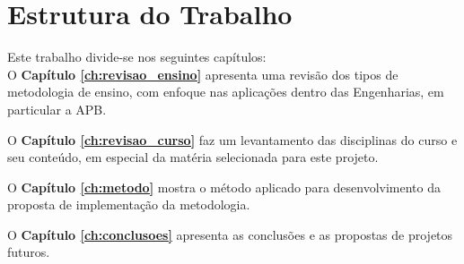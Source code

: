 	\section{Estrutura do Trabalho}
	
		Este trabalho divide-se nos seguintes capítulos:\\
		
		O \textbf{Capítulo \ref{ch:revisao_ensino}} apresenta uma revisão dos tipos de metodologia de ensino, com enfoque nas aplicações dentro das Engenharias, em particular a APB.
		
		O \textbf{Capítulo \ref{ch:revisao_curso}} faz um levantamento das disciplinas do curso e seu conteúdo, em especial da matéria selecionada para este projeto.
		
		O \textbf{Capítulo \ref{ch:metodo}} mostra o método aplicado para desenvolvimento da proposta de implementação da metodologia.
		
		O \textbf{Capítulo \ref{ch:conclusoes}} apresenta as conclusões e as propostas de projetos futuros.